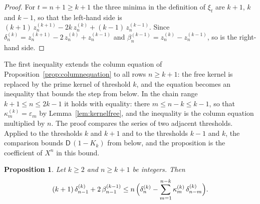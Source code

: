 \documentclass{amsart}
\newtheorem{proposition}[theorem]{Proposition}
\theoremstyle{definition}
\theoremstyle{remark}
\numberwithin{equation}{section}
\begin{document}
\begin{proof}
For $t=n+1\ge k+1$ the three minima in the definition of $\xi_t$ are $k+1$, $k$ and $k-1$, so that the left-hand side is $(k+1)\,z^{(k+1)}_n-2k\,z^{(k)}_n+(k-1)\,z^{(k-1)}_n$. Since $\delta^{(k)}_n=z^{(k+1)}_n-2\,z^{(k)}_n+z^{(k-1)}_n$ and $\beta^{(k-1)}_n=z^{(k)}_n-z^{(k-1)}_n$, so is the right-hand side.
\end{proof}

The first inequality extends the column equation of Proposition~\ref{prop:columnequation} to all rows $n\ge k+1$: the free kernel is replaced by the prime kernel of threshold $k$, and the equation becomes an inequality that bounds the step from below. In the chain range $k+1\le n\le 2k-1$ it holds with equality: there $m\le n-k\le k-1$, so that $\kappa^{(k)}_m=\varepsilon_m$ by Lemma~\ref{lem:kernelfree}, and the inequality is the column equation multiplied by $n$. The proof compares the series of two adjacent thresholds. Applied to the thresholds $k$ and $k+1$ and to the thresholds $k-1$ and $k$, the comparison bounds $\mathsf{D}\,(1-K_k)$ from below, and the proposition is the coefficient of $X^n$ in this bound.

\begin{proposition}\label{prop:columninequality}
Let $k\ge 2$ and $n\ge k+1$ be integers. Then
\[
(k+1)\,\delta^{(k)}_{n-1}+2\,\beta^{(k-1)}_{n-1}\le n\,\Bigl(\delta^{(k)}_n-\sum_{m=1}^{n-k}\kappa^{(k)}_m\,\delta^{(k)}_{n-m}\Bigr).
\]
\end{proposition}
\end{document}
